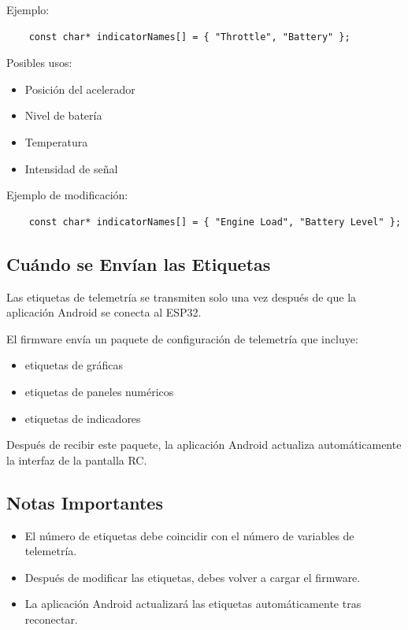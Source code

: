 Ejemplo:

\begin{verbatim}
    const char* indicatorNames[] = { "Throttle", "Battery" };
\end{verbatim}

Posibles usos:

\begin{itemize}
    \item Posición del acelerador
    \item Nivel de batería
    \item Temperatura
    \item Intensidad de señal
\end{itemize}

Ejemplo de modificación:

\begin{verbatim}
    const char* indicatorNames[] = { "Engine Load", "Battery Level" };
\end{verbatim}

\subsection{Cuándo se Envían las Etiquetas}

Las etiquetas de telemetría se transmiten solo una vez después de que la aplicación Android se conecta al ESP32.

El firmware envía un paquete de configuración de telemetría que incluye:

\begin{itemize}
    \item etiquetas de gráficas
    \item etiquetas de paneles numéricos
    \item etiquetas de indicadores
\end{itemize}

Después de recibir este paquete, la aplicación Android actualiza automáticamente la interfaz de la pantalla RC.

\subsection{Notas Importantes}

\begin{itemize}
    \item El número de etiquetas debe coincidir con el número de variables de telemetría.
    \item Después de modificar las etiquetas, debes volver a cargar el firmware.
    \item La aplicación Android actualizará las etiquetas automáticamente tras reconectar.
\end{itemize}